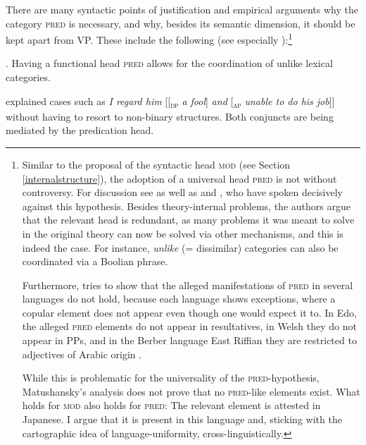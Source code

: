 There are many syntactic points of justification and empirical arguments why the category \textsc{pred} is necessary, and why, besides its semantic dimension, it should be kept apart from VP. These include the following (see especially \citealt[598–599]{bowers:1993:predication}):\footnote{Similar to the proposal of the syntactic head \textsc{mod} (see Section \ref{internalstructure}), the adoption of a universal head \textsc{pred} is not without controversy. For discussion see \citet{bowers:1993:predication, bowers:2002:pred, svenonius:1996:pred, dikken:2006:relators, heycock:2013:syntax} as well as \citet{matushansky:2019:against} and \citet{bruening:2020:category}, who have spoken decisively against this hypothesis. Besides theory-internal problems, the authors argue that the relevant head is redundant, as many problems it was meant to solve in the original theory can now be solved via other mechanisms, and this is indeed the case. For instance, \textit{unlike} (= dissimilar) categories can also be coordinated via a Boolian phrase.

\par

Furthermore, \citet{matushansky:2019:against} tries to show that the alleged manifestations of \textsc{pred} in several languages do not hold, because each language shows exceptions, where a copular element does not appear even though one would expect it to. In Edo, the alleged \textsc{pred} elements do not appear in resultatives, in Welsh they do not appear in PPs, and in the Berber language East Riffian they are restricted to adjectives of Arabic origin \citep[§ 4]{matushansky:2019:against}.

\par

While this is problematic for the universality of the \textsc{pred}-hypothesis, Matushansky's analysis does not prove that no \textsc{pred}-like elements exist. What holds for \textsc{mod} also holds for \textsc{pred}: The relevant element is attested in Japanese. I argue that it is present in this language and, sticking with the cartographic idea of language-uniformity, cross-linguistically.}

\ex. Having a functional head \textsc{pred} allows for the coordination of unlike lexical categories.

\citet{bowers:1993:predication} explained cases such as \textit{I regard him} [[\textsubscript{\textsc{dp}} \textit{a fool}] \textit{and} [\textsubscript{\textsc{ap}} \textit{unable to do his job}]] without having to resort to non-binary structures. Both conjuncts are being mediated by the predication head. 

